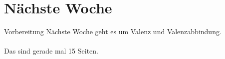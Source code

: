 \section{Nächste Woche}

\begin{frame}
  {Vorbereitung}
  \onslide<+->
  \onslide<+->
  \centering 
  \large
  Nächste Woche geht es um Valenz und Valenzabbindung.\\
  \onslide<+->
  \Zeile
  \\
    \onslide<+->
    \Viertelzeile
  Das sind gerade mal 15 Seiten.
\end{frame}
